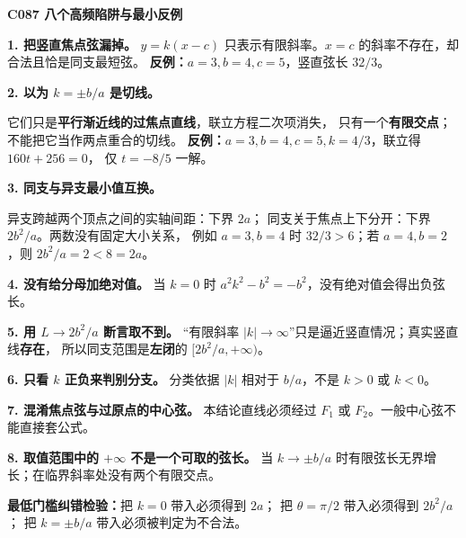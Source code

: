 \clearpage
\begin{trapbox}
\textbf{C087 八个高频陷阱与最小反例}

\textbf{1. 把竖直焦点弦漏掉。}
$y=k(x-c)$ 只表示有限斜率。$x=c$ 的斜率不存在，却合法且恰是同支最短弦。
\textbf{反例：}$a=3,b=4,c=5$，竖直弦长 $32/3$。

\textbf{2. 以为 $k=\pm b/a$ 是切线。}
\begin{center}\end{center}
它们只是\textbf{平行渐近线的过焦点直线}，联立方程二次项消失，
只有一个\textbf{有限交点}；不能把它当作两点重合的切线。
\textbf{反例：}$a=3,b=4,c=5,k=4/3$，联立得 $160t+256=0$，
仅 $t=-8/5$ 一解。

\tcbbreak
\textbf{3. 同支与异支最小值互换。}
\begin{center}\end{center}
异支跨越两个顶点之间的实轴间距：下界 $2a$；
同支关于焦点上下分开：下界 $2b^2/a$。两数没有固定大小关系，
例如 $a=3,b=4$ 时 $32/3>6$；若 $a=4,b=2$，则 $2b^2/a=2<8=2a$。

\textbf{4. 没有给分母加绝对值。}
当 $k=0$ 时 $a^2k^2-b^2=-b^2$，没有绝对值会得出负弦长。

\textbf{5. 用 $L\to2b^2/a$ 断言取不到。}
“有限斜率 $|k|\to\infty$”只是逼近竖直情况；真实竖直线\textbf{存在}，
所以同支范围是\textbf{左闭}的 $[2b^2/a,+\infty)$。

\textbf{6. 只看 $k$ 正负来判别分支。}
分类依据 $|k|$ 相对于 $b/a$，不是 $k>0$ 或 $k<0$。

\textbf{7. 混淆焦点弦与过原点的中心弦。}
本结论直线必须经过 $F_1$ 或 $F_2$。一般中心弦不能直接套公式。

\textbf{8. 取值范围中的 $+\infty$ 不是一个可取的弦长。}
当 $k\to\pm b/a$ 时有限弦长无界增长；在临界斜率处没有两个有限交点。

\textbf{最低门槛纠错检验：}把 $k=0$ 带入必须得到 $2a$；
把 $\theta=\pi/2$ 带入必须得到 $2b^2/a$；
把 $k=\pm b/a$ 带入必须被判定为不合法。
\end{trapbox}
